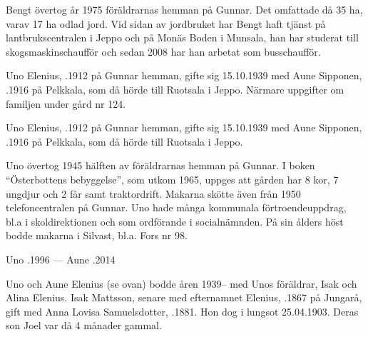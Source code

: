 Bengt övertog år 1975 föräldrarnas hemman på Gunnar. Det omfattade då 35 ha, varav 17 ha odlad jord. Vid sidan av jordbruket har Bengt haft tjänst på lantbrukscentralen i Jeppo och på Monäs Boden i Munsala, han har studerat till skogsmaskinschaufför och sedan 2008 har han arbetat som busschaufför.


Uno Elenius, .1912 på Gunnar hemman, gifte sig 15.10.1939 med Aune Sipponen, .1916 på Pelkkala, som då hörde till Ruotsala i Jeppo. Närmare uppgifter om familjen under gård nr 124.




Uno Elenius, .1912 på Gunnar hemman, gifte sig 15.10.1939 med Aune Sipponen, .1916 på Pelkkala, som då hörde till Ruotsala i Jeppo.
\begin{jhchildren}
  \item {}
  \item {}
  \item {}
  \item {}
\end{jhchildren}

Uno övertog 1945 hälften av föräldrarnas hemman på Gunnar. I boken ``Österbottens bebyggelse'', som utkom 1965, uppges att gården har 8 kor, 7 ungdjur och 2 får samt traktordrift. Makarna skötte även från 1950 telefoncentralen på Gunnar. Uno hade många kommunala förtroendeuppdrag, bl.a i skoldirektionen och som ordförande i socialnämnden. På sin ålders höst bodde makarna i Silvast, bl.a. Fors nr 98.

Uno .1996  ---  Aune .2014



Uno och Aune Elenius (se ovan) bodde åren 1939-- med Unos föräldrar, Isak och Alina Elenius. Isak Mattsson, senare med efternamnet Elenius, .1867 på Jungarå, gift med Anna Lovisa Samuelsdotter, .1881. Hon dog i lungsot 25.04.1903. Deras son Joel var då 4 månader gammal.

